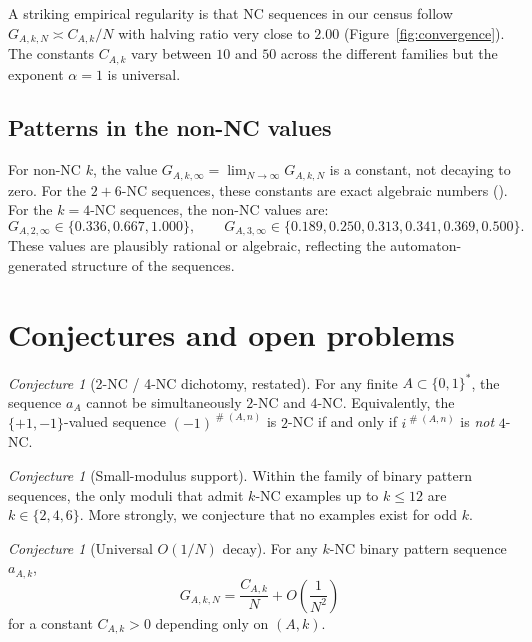 \documentclass[11pt]{article}
\theoremstyle{definition}
\theoremstyle{remark}
\newtheorem{conjecture}[theorem]{Conjecture}
\DeclareMathOperator{\occ}{\#}
\begin{document}
A striking empirical regularity is that NC sequences in our census
follow $G_{A,k,N} \asymp C_{A,k}/N$ with halving ratio very close to
$2.00$ (Figure~\ref{fig:convergence}).  The constants
$C_{A,k}$ vary between $10$ and $50$ across the different families
but the exponent $\alpha = 1$ is universal.

\subsection{Patterns in the non-NC values}

For non-NC $k$, the value $G_{A,k,\infty} = \lim_{N \to \infty}
G_{A,k,N}$ is a constant, not decaying to zero.  For the $2+6$-NC
sequences, these constants are exact algebraic numbers
().  For the $k=4$-NC sequences, the
non-NC values are:
\[
  G_{A,2,\infty} \in \{0.336, 0.667, 1.000\},
  \qquad
  G_{A,3,\infty} \in \{0.189, 0.250, 0.313, 0.341, 0.369, 0.500\}.
\]
These values are plausibly rational or algebraic, reflecting the
automaton-generated structure of the sequences.

\section{Conjectures and open problems}
\label{sec:open}

\begin{conjecture}[2-NC / 4-NC dichotomy, restated]
\label{conj:dichotomy2}
For any finite $A \subset \{0,1\}^*$, the sequence $a_A$ cannot be
simultaneously $2$-NC and $4$-NC.  Equivalently, the $\{+1,-1\}$-valued
sequence $(-1)^{\occ(A,n)}$ is $2$-NC if and only if
$i^{\occ(A,n)}$ is \emph{not} $4$-NC.
\end{conjecture}

\begin{conjecture}[Small-modulus support]
\label{conj:k_values}
Within the family of binary pattern sequences, the only moduli that
admit $k$-NC examples up to $k\le 12$ are $k\in\{2,4,6\}$.
More strongly, we conjecture that no examples exist for odd $k$.
\end{conjecture}

\begin{conjecture}[Universal $O(1/N)$ decay]
For any $k$-NC binary pattern sequence $a_{A,k}$,
\[
  G_{A,k,N} = \frac{C_{A,k}}{N} + O\!\left(\frac{1}{N^2}\right)
\]
for a constant $C_{A,k} > 0$ depending only on $(A, k)$.
\end{conjecture}
\end{document}
